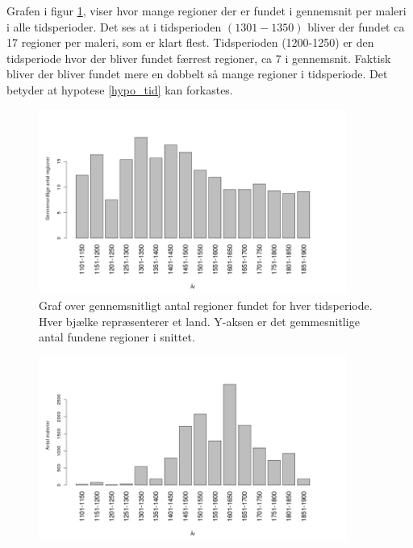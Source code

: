 Grafen i figur \ref{naiv_year}, viser hvor mange regioner der
er fundet i gennemsnit per maleri i alle tidsperioder. Det ses at i
tidsperioden $(1301-1350)$ bliver der fundet ca 17 regioner per maleri,
som er klart flest. Tidsperioden (1200-1250) er den tidsperiode hvor der
bliver fundet færrest regioner, ca 7 i gennemsnit. Faktisk bliver der bliver fundet
mere en dobbelt så mange regioner i tidsperiode. Det betyder at
hypotese \ref{hypo_tid} kan forkastes.

\begin{figure}[!h]
	\begin{center}
		\includegraphics[angle=0,width=0.90\textwidth]{afsnit/resultater/billeder/yearcut.png}
	\end{center}
	\caption{Graf over gennemsnitligt antal regioner fundet for hver
       tidsperiode. Hver bjælke repræsenterer et land. Y-aksen er
       det gemmesnitlige antal fundene regioner i snittet.}
	\label{naiv_year}
\end{figure}

\begin{figure}[!h]
	\begin{center}
		\includegraphics[angle=0,width=0.90\textwidth]{afsnit/resultater/billeder/yearNrImage.png}
	\end{center}
	\caption{}
	\label{naiv_yearNrImage}
\end{figure}


